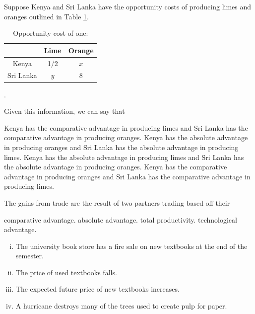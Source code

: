 \documentclass[addpoints,11pt]{exam}
\theoremstyle{definition}
\begin{document}
\begin{questions}
\question Suppose Kenya and Sri Lanka have the opportunity costs of producing limes and oranges outlined in  Table \ref{blah}.

\begin{table}[H]
	\caption{Opportunity cost of one:}
	\centering
	\begin{tabular}{ c|c|c} 
		
		& Lime & Orange \\
		\hline
		Kenya & 1/2 & $x$  \\
		Sri Lanka & $y$  & 8  \\
	\end{tabular}
	\label{blah}
\end{table}.

Given this information, we can say that

\begin{choices}
	\choice Kenya has the comparative advantage in producing limes and Sri Lanka has the comparative advantage in producing oranges.
	\choice Kenya has the absolute advantage in producing oranges and Sri Lanka has the absolute advantage in producing limes.
	\choice Kenya has the absolute advantage in producing limes and Sri Lanka has the absolute advantage in producing oranges.
	\CorrectChoice Kenya has the comparative advantage in producing oranges and Sri Lanka has the comparative advantage in producing limes.
\end{choices}


\question The gains from trade are the result of two partners trading based off their 

\begin{choices}
	\CorrectChoice comparative advantage.
	\choice absolute advantage.
	\choice total productivity.
	\choice technological advantage.
\end{choices}



\begin{enumerate}[i.]
	\item The university book store has a fire sale on new textbooks at the end of the semester.
	\item The price of used textbooks falls.
	\item The expected future price of new textbooks increases.
	\item A hurricane destroys many of the trees used to create pulp for paper.
\end{enumerate}


\end{questions}
\end{document}
